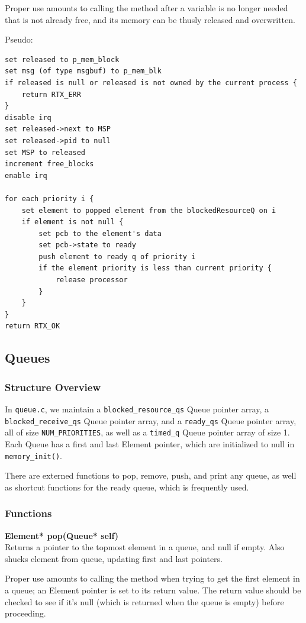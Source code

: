 \documentclass[11pt, oneside]{article}
\begin{document}
Proper use amounts to calling the method after a variable is no longer needed that is not already free, and its memory can be thusly released and overwritten.

Pseudo:
\begin{verbatim}
set released to p_mem_block
set msg (of type msgbuf) to p_mem_blk
if released is null or released is not owned by the current process {
    return RTX_ERR
}
disable irq
set released->next to MSP
set released->pid to null
set MSP to released
increment free_blocks
enable irq

for each priority i {
    set element to popped element from the blockedResourceQ on i
    if element is not null {
        set pcb to the element's data
        set pcb->state to ready
        push element to ready q of priority i
        if the element priority is less than current priority {
            release processor
        }
    }
}
return RTX_OK
\end{verbatim}


\subsection{Queues}
\subsubsection{Structure Overview}
In {\tt queue.c}, we maintain a {\tt blocked\_resource\_qs} Queue pointer array, a {\tt blocked\_receive\_qs} Queue pointer array, and a {\tt ready\_qs} Queue pointer array, all of size {\tt NUM\_PRIORITIES}, as well as a {\tt timed\_q} Queue pointer array of size 1. Each Queue has a first and last Element pointer, which are initialized to null in {\tt memory\_init()}.

There are externed functions to pop, remove, push, and print any queue, as well as shortcut functions for the ready queue, which is frequently used.

\subsubsection{Functions}
{\bf Element* pop(Queue* self)}\\
Returns a pointer to the topmost element in a queue, and null if empty. Also shucks element from queue, updating first and last pointers.

Proper use amounts to calling the method when trying to get the first element in a queue; an Element pointer is set to its return value. The return value should be checked to see if it's null (which is returned when the queue is empty) before proceeding.
\end{document}
